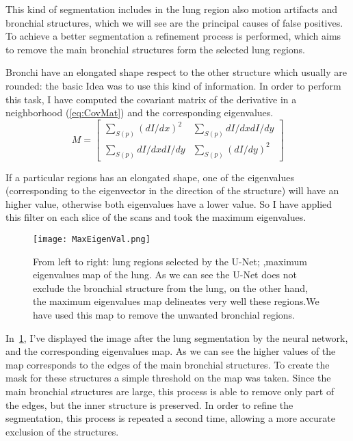 \documentclass{standalone}
\begin{document}
	This kind of segmentation includes in the lung region also motion artifacts and bronchial structures, which we will see are the principal causes of false positives. To achieve a better segmentation a refinement process is performed, which aims to remove the main bronchial structures form the selected lung regions. 

	Bronchi have an elongated shape respect to the other structure which usually are rounded: the basic Idea was to use this kind of information. In order to perform this task, I have  computed the covariant matrix of the derivative in a neighborhood (\ref{eq:CovMat}) and the corresponding eigenvalues. 
	\begin{equation}\label{eq:CovMat}
		M = \begin{bmatrix} \sum _{S(p)}(dI/dx)^2 & \sum _{S(p)}dI/dx dI/dy \\ \sum _{S(p)}dI/dx dI/dy & \sum _{S(p)}(dI/dy)^2 \end{bmatrix}
	\end{equation}
	
	If a particular regions has an elongated shape, one of the eigenvalues (corresponding to the eigenvector in the direction of the structure) will have an higher value, otherwise both eigenvalues have a lower value. So I have applied this filter on each slice of the scans and took the maximum eigenvalues. 
	\begin{figure}[h!]
		\centering
			\texttt{[image: MaxEigenVal.png]}
		\caption{From left to right: lung regions selected by the U-Net; ,maximum eigenvalues map of the lung. As we can see the U-Net does not exclude the bronchial structure from the lung, on the other hand, the maximum eigenvalues map delineates very well these regions.We have used this map to remove the unwanted bronchial regions.}\label{fig:MaxEigenval}
	\end{figure}

	In \figurename\,\ref{fig:MaxEigenval}, I've displayed the image after the lung segmentation by the neural network, and the corresponding eigenvalues map. As we can see the higher values of the map corresponds to the edges of the main bronchial structures. To create the mask for these structures a simple threshold on the map was taken. Since the main bronchial structures are large, this process is able to remove only part of the edges, but the inner structure is preserved. In order to refine the segmentation, this process is repeated a second time, allowing a more accurate exclusion of the structures.
\end{document}

